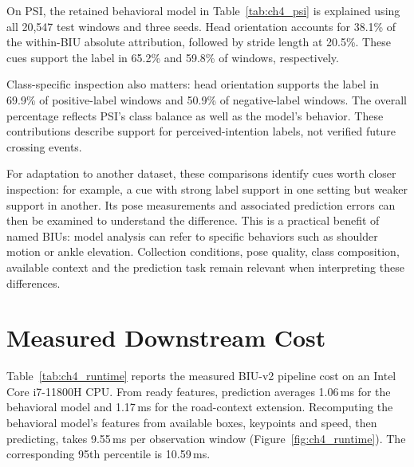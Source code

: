 
On PSI, the retained behavioral model in Table~\ref{tab:ch4_psi} is explained using
all 20,547 test windows and three seeds. Head orientation accounts for 38.1\%
of the within-BIU absolute attribution, followed by stride length at 20.5\%.
These cues support the label in 65.2\% and 59.8\% of windows, respectively.

Class-specific inspection also matters: head orientation supports the label in
69.9\% of positive-label windows and 50.9\% of negative-label windows. The overall
percentage reflects PSI's class balance as well as the model's behavior. These
contributions describe support for perceived-intention labels, not verified future
crossing events.

For adaptation to another dataset, these comparisons identify cues worth closer
inspection: for example, a cue with strong label support in one setting but weaker
support in another. Its pose measurements and associated prediction errors can then
be examined to understand the difference. This is a practical benefit of named BIUs:
model analysis can refer to specific behaviors such as shoulder motion or ankle
elevation. Collection conditions, pose quality, class composition, available context
and the prediction task remain relevant when interpreting these differences.

\FloatBarrier
\section{Measured Downstream Cost}\label{sec:ch4_cost}

Table~\ref{tab:ch4_runtime} reports the measured BIU-v2 pipeline cost on an Intel Core
i7-11800H CPU. From ready features, prediction averages 1.06\,ms for the behavioral model
and 1.17\,ms for the road-context extension. Recomputing the behavioral model’s features from available boxes,
keypoints and speed, then predicting, takes 9.55\,ms per observation window
(Figure~\ref{fig:ch4_runtime}). The corresponding 95th percentile is 10.59\,ms.




